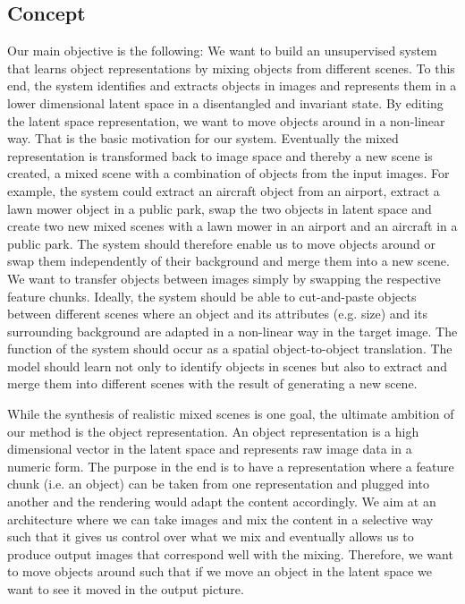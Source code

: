\documentclass[12pt,a4paper]{article}
\begin{document}
\subsection{Concept}\label{subsec:concept}
Our main objective is the following: We want to build an unsupervised system that learns object representations by mixing objects from different scenes. To this end, the system identifies and extracts objects in images and represents them in a lower dimensional latent space in a disentangled and invariant state. By editing the latent space representation, we want to move objects around in a non-linear way. That is the basic motivation for our system. Eventually the mixed representation is transformed back to image space and thereby a new scene is created, a mixed scene with a combination of objects from the input images. For example, the system could extract an aircraft object from an airport, extract a lawn mower object in a public park, swap the two objects in latent space and create two new mixed scenes with a lawn mower in an airport and an aircraft in a public park. 
The system should therefore enable us to move objects around or swap them independently of their background and merge them into a new scene. We want to transfer objects between images simply by swapping the respective feature chunks. Ideally, the system should be able to cut-and-paste objects between different scenes where an object and its attributes (e.g. size) and its surrounding background are adapted in a non-linear way in the target image. The function of the system should occur as a spatial object-to-object translation. The model should learn not only to identify objects in scenes but also to extract and merge them into different scenes with the result of generating a new scene. 

While the synthesis of realistic mixed scenes is one goal, the ultimate ambition of our method is the object representation. An object representation is a high dimensional vector in the latent space and represents raw image data in a numeric form. The purpose in the end is to have a representation where a feature chunk (i.e. an object) can be taken from one representation and plugged into another and the rendering would adapt the content accordingly. We aim at an architecture where we can take images and mix the content in a selective way such that it gives us control over what we mix and eventually allows us to produce output images that correspond well with the mixing. Therefore, we want to move objects around such that if we move an object in the latent space we want to see it moved in the output picture. 
\end{document}
